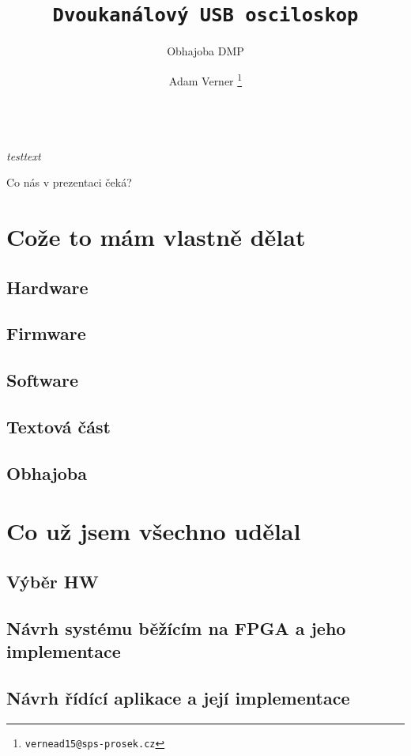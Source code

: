 \documentclass{beamer}
\title{\texttt{\LARGE Dvoukanálový USB osciloskop}}
\subtitle{ Obhajoba DMP }
\author{ Adam Verner \footnote{\texttt{vernead15@sps-prosek.cz}}}
\begin{document}
\begin{frame}
  \maketitle \\
  \textit{testtext}
\end{frame}

\begin{frame}{Co nás v prezentaci čeká?}
  \tableofcontents
\end{frame}

\section{Cože to mám vlastně dělat}


\subsection{Hardware}
\subsection{Firmware}
\subsection{Software}
\subsection{Textová část}
\subsection{Obhajoba}  %


\section{Co už jsem všechno udělal}
\subsection{Výběr HW}
\subsection{Návrh systému běžícím na FPGA a jeho implementace}
\subsection{Návrh řídící aplikace a její implementace}
\end{document}
